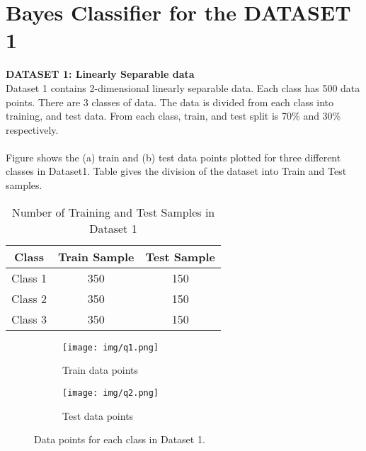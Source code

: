 \section{Bayes Classifier for the DATASET 1}
\textbf{DATASET 1: Linearly Separable data}\\
Dataset 1 contains 2-dimensional linearly separable data. Each class has 500 data points. There are 3 classes of data. The data is divided from each class into training, and test data. From each class, train, and test split is 70\% and 30\% respectively.\\
\\
Figure shows the (a) train and (b) test data points plotted for three different classes in Dataset1. Table gives the division of the dataset into Train and Test samples.


\begin{table}[H]
\centering
\begin{tabular}{|c|c|c|}
\hline
\textbf{Class} & \textbf{Train Sample} & \textbf{Test Sample}\\
\hline
Class 1 & 350 & 150 \\
\hline 
Class 2 & 350 & 150 \\
\hline
Class 3 & 350 & 150 \\
\hline
\end{tabular}
\caption{Number of Training and Test Samples in Dataset 1}
\label{tab:Table1}
\end{table}


\begin{figure}[!hbt]
    \begin{subfigure}{0.49\textwidth}
        \texttt{[image: img/q1.png]}
        \caption{Train data points}
    \end{subfigure}
    \hfill
    \begin{subfigure}{0.49\textwidth}
        \texttt{[image: img/q2.png]}
        \caption{Test data points}
    \end{subfigure}
    
    
    \caption{ Data points for each class in Dataset 1.}
    \label{fig:Figure2}
\end{figure}

